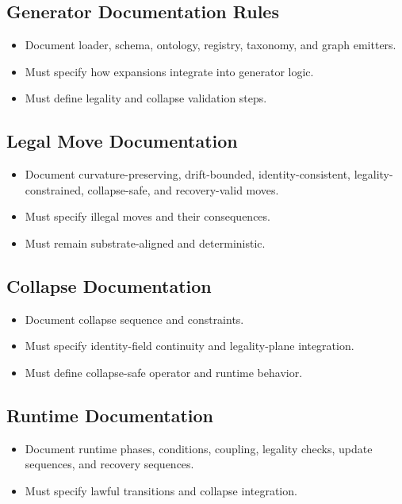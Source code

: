 \subsection{Generator Documentation Rules}
\begin{itemize}
    \item Document loader, schema, ontology, registry, taxonomy, and graph emitters.
    \item Must specify how expansions integrate into generator logic.
    \item Must define legality and collapse validation steps.
\end{itemize}

\subsection{Legal Move Documentation}
\begin{itemize}
    \item Document curvature-preserving, drift-bounded, identity-consistent, legality-constrained, collapse-safe, and recovery-valid moves.
    \item Must specify illegal moves and their consequences.
    \item Must remain substrate-aligned and deterministic.
\end{itemize}

\subsection{Collapse Documentation}
\begin{itemize}
    \item Document collapse sequence and constraints.
    \item Must specify identity-field continuity and legality-plane integration.
    \item Must define collapse-safe operator and runtime behavior.
\end{itemize}

\subsection{Runtime Documentation}
\begin{itemize}
    \item Document runtime phases, conditions, coupling, legality checks, update sequences, and recovery sequences.
    \item Must specify lawful transitions and collapse integration.
\end{itemize}

